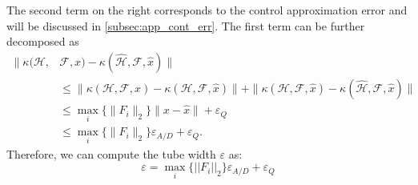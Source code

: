 {	The second term on the right corresponds to the control approximation error and will be discussed in \autoref{subsec:app_cont_err}.
 	 	The first term can be further decomposed as
 	 	\begin{align*}
 	 	\|\kappa(\mathcal H,&\mathcal F,x)-\kappa(\hat{\mathcal H},\mathcal F,\hat x)\|\\
 	 	&\le \|\kappa(\mathcal H,\mathcal F,x)-\kappa(\mathcal H,\mathcal F,\hat x)\|+
 	 	\|\kappa(\mathcal H,\mathcal F,\hat x) - \kappa(\hat{\mathcal H},\mathcal F,\hat x)\|\\
 	 	&\le \max_i\{\|F_i\|_2\}\|x-\hat x\| + \varepsilon_Q\\
 	 	& \le \max_i\{\|F_i\|_2\}\varepsilon_{A/D}+ \varepsilon_Q.
 	 	\end{align*}
 	 	Therefore, we can compute the tube width $\varepsilon$ as:
 	 	\begin{equation}\label{eq:epsilontot}
 	 	\varepsilon=\max_i \{||F_i||_2\}\varepsilon_{A/D}+\varepsilon_{Q}
 	 	\end{equation}
 	}
%
